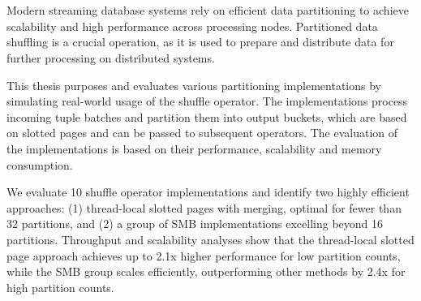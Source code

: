 \chapter{\abstractname}

Modern streaming database systems rely on efficient data partitioning to achieve scalability and high performance across processing nodes.
Partitioned data shuffling is a crucial operation, as it is used to prepare and distribute data for further processing on distributed systems.

This thesis purposes and evaluates various partitioning implementations by simulating real-world usage of the shuffle operator.
The implementations process incoming tuple batches and partition them into output buckets, which are based on slotted pages and can be passed to subsequent operators.
The evaluation of the implementations is based on their performance, scalability and memory consumption.

We evaluate 10 shuffle operator implementations and identify two highly efficient approaches: (1) thread-local slotted pages with merging, optimal for fewer than 32 partitions, and (2) a group of \ac{SMB} implementations excelling beyond 16 partitions.
Throughput and scalability analyses show that the thread-local slotted page approach achieves up to 2.1x higher performance for low partition counts, while the \ac{SMB} group scales efficiently, outperforming other methods by 2.4x for high partition counts.
